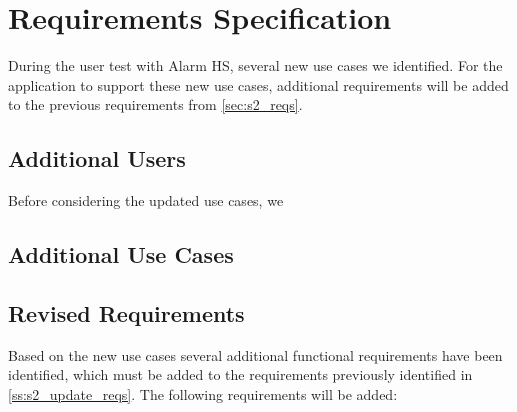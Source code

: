 \section{Requirements Specification} \label{sec:s3_requirements}
During the user test with Alarm HS, several new use cases we identified. For the application to support these new use cases, additional requirements will be added to the previous requirements from \cref{sec:s2_reqs}.

\subsection{Additional Users} \label{ss:s3_users}
Before considering the updated use cases, we 

\subsection{Additional Use Cases \label{ss:s3_uc}}

\subsection{Revised Requirements} \label{ss:s2_reqs}
Based on the new use cases several additional functional requirements have been identified, which must be added to the requirements previously identified in \cref{ss:s2_update_reqs}. The following requirements will be added:

